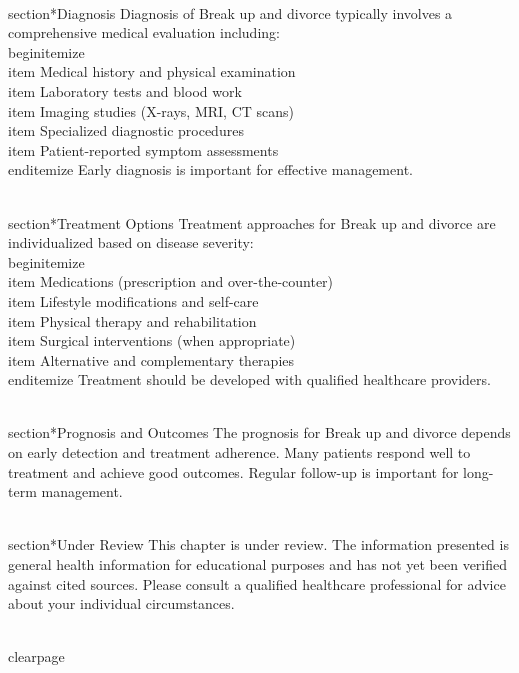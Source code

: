 \\section*{Diagnosis}
Diagnosis of Break up and divorce typically involves a comprehensive medical evaluation including:
\\begin{itemize}
  \\item Medical history and physical examination
  \\item Laboratory tests and blood work
  \\item Imaging studies (X-rays, MRI, CT scans)
  \\item Specialized diagnostic procedures
  \\item Patient-reported symptom assessments
\\end{itemize}
Early diagnosis is important for effective management.

\\section*{Treatment Options}
Treatment approaches for Break up and divorce are individualized based on disease severity:
\\begin{itemize}
  \\item Medications (prescription and over-the-counter)
  \\item Lifestyle modifications and self-care
  \\item Physical therapy and rehabilitation
  \\item Surgical interventions (when appropriate)
  \\item Alternative and complementary therapies
\\end{itemize}
Treatment should be developed with qualified healthcare providers.

\\section*{Prognosis and Outcomes}
The prognosis for Break up and divorce depends on early detection and treatment adherence. Many patients respond well to treatment and achieve good outcomes. Regular follow-up is important for long-term management.

\\section*{Under Review}
This chapter is under review. The information presented is general health information for educational purposes and has not yet been verified against cited sources. Please consult a qualified healthcare professional for advice about your individual circumstances.

\\clearpage
